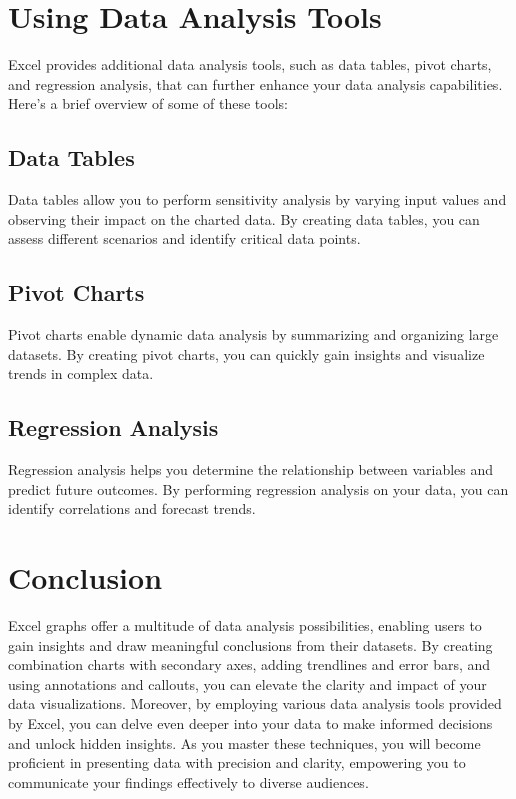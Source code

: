 \documentclass[
]{book}
\begin{document}
\hypertarget{using-data-analysis-tools}{%
\section{Using Data Analysis Tools}\label{using-data-analysis-tools}}

Excel provides additional data analysis tools, such as data tables, pivot charts, and regression analysis, that can further enhance your data analysis capabilities. Here's a brief overview of some of these tools:

\hypertarget{data-tables}{%
\subsection{Data Tables}\label{data-tables}}

Data tables allow you to perform sensitivity analysis by varying input values and observing their impact on the charted data. By creating data tables, you can assess different scenarios and identify critical data points.

\hypertarget{pivot-charts}{%
\subsection{Pivot Charts}\label{pivot-charts}}

Pivot charts enable dynamic data analysis by summarizing and organizing large datasets. By creating pivot charts, you can quickly gain insights and visualize trends in complex data.

\hypertarget{regression-analysis}{%
\subsection{Regression Analysis}\label{regression-analysis}}

Regression analysis helps you determine the relationship between variables and predict future outcomes. By performing regression analysis on your data, you can identify correlations and forecast trends.

\hypertarget{conclusion-3}{%
\section{Conclusion}\label{conclusion-3}}

Excel graphs offer a multitude of data analysis possibilities, enabling users to gain insights and draw meaningful conclusions from their datasets. By creating combination charts with secondary axes, adding trendlines and error bars, and using annotations and callouts, you can elevate the clarity and impact of your data visualizations. Moreover, by employing various data analysis tools provided by Excel, you can delve even deeper into your data to make informed decisions and unlock hidden insights. As you master these techniques, you will become proficient in presenting data with precision and clarity, empowering you to communicate your findings effectively to diverse audiences.
\end{document}
